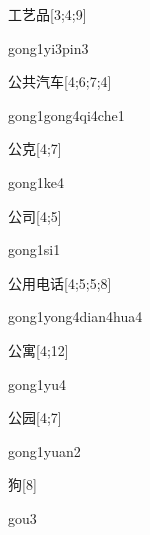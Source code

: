 \begin{verbete}{工艺品}[3;4;9]
\begin{pronuncia}{gong1yi3pin3}
\end{pronuncia}
\end{verbete}

\begin{verbete}{公共汽车}[4;6;7;4]
\begin{pronuncia}[\\]{gong1gong4qi4che1}
\end{pronuncia}
\end{verbete}

\begin{verbete}[gong1ke4]{公克}[4;7]
\begin{pronuncia}{gong1ke4}
\end{pronuncia}
\end{verbete}

\begin{verbete}[gong1si1]{公司}[4;5]
\begin{pronuncia}{gong1si1}
\end{pronuncia}
\end{verbete}

\begin{verbete}{公用电话}[4;5;5;8]
\begin{pronuncia}[\\]{gong1yong4dian4hua4}
\end{pronuncia}
\end{verbete}

\begin{verbete}[gong1yu4]{公寓}[4;12]
\begin{pronuncia}{gong1yu4}
\end{pronuncia}
\end{verbete}

\begin{verbete}{公园}[4;7]
\begin{pronuncia}{gong1yuan2}
\end{pronuncia}
\end{verbete}

\begin{verbete}[gou3]{狗}[8]
\begin{pronuncia}{gou3}
\end{pronuncia}
\end{verbete}

